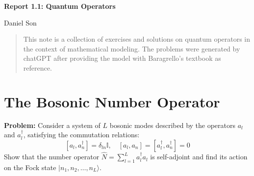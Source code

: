 \documentclass{article}
\numberwithin{equation}{section}
\begin{document}
\begin{center}
    \Large
    \textbf{Report 1.1: Quantum Operators}

    \large
    Daniel Son
\end{center}

\begin{abstract}
    This note is a collection of exercises and solutions on 
    quantum operators in the context of mathematical modeling. 
    The problems were generated by chatGPT after providing the model 
    with Baragrello's textbook as reference. 
\end{abstract}

\section{The Bosonic Number Operator}

\textbf{Problem:}  
Consider a system of \( L \) bosonic modes described by the operators \( a_l \) and \( a_l^\dagger \), satisfying the commutation relations:
\[
[a_l, a_n^\dagger] = \delta_{ln} \mathbb{I}, \quad [a_l, a_n] = [a_l^\dagger, a_n^\dagger] = 0
\]
Show that the number operator \( \hat{N} = \sum_{l=1}^L a_l^\dagger a_l \) is self-adjoint and find its action on the Fock state \( |n_1, n_2, \dots, n_L \rangle \).
\end{document}
